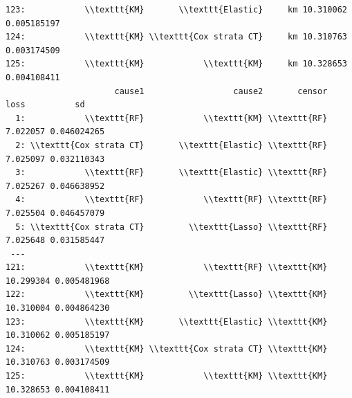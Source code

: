 \documentclass[11pt]{article}
\begin{document}
\begin{verbatim}
123:            \\texttt{KM}       \\texttt{Elastic}     km 10.310062 0.005185197
124:            \\texttt{KM} \\texttt{Cox strata CT}     km 10.310763 0.003174509
125:            \\texttt{KM}            \\texttt{KM}     km 10.328653 0.004108411
                      cause1                  cause2       censor      loss          sd
  1:            \\texttt{RF}            \\texttt{KM} \\texttt{RF}  7.022057 0.046024265
  2: \\texttt{Cox strata CT}       \\texttt{Elastic} \\texttt{RF}  7.025097 0.032110343
  3:            \\texttt{RF}       \\texttt{Elastic} \\texttt{RF}  7.025267 0.046638952
  4:            \\texttt{RF}            \\texttt{RF} \\texttt{RF}  7.025504 0.046457079
  5: \\texttt{Cox strata CT}         \\texttt{Lasso} \\texttt{RF}  7.025648 0.031585447
 ---                                                                                   
121:            \\texttt{KM}            \\texttt{RF} \\texttt{KM} 10.299304 0.005481968
122:            \\texttt{KM}         \\texttt{Lasso} \\texttt{KM} 10.310004 0.004864230
123:            \\texttt{KM}       \\texttt{Elastic} \\texttt{KM} 10.310062 0.005185197
124:            \\texttt{KM} \\texttt{Cox strata CT} \\texttt{KM} 10.310763 0.003174509
125:            \\texttt{KM}            \\texttt{KM} \\texttt{KM} 10.328653 0.004108411
\end{verbatim}
\end{document}
